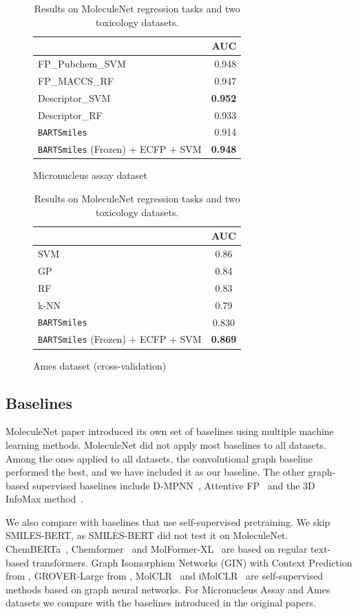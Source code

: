 \documentclass{article} %
\newcommand{\MODEL}{\texttt{BARTSmiles}}
\begin{document}
\begin{table}[h]
\begin{subfigure}{.4\textwidth}
\begin{tabular}{lr}
        \toprule
                           & AUC   \\ \midrule
        FP\_Pubchem\_SVM   & 0.948 \\
        FP\_MACCS\_RF      & 0.947 \\
        Descriptor\_SVM            & \textbf{0.952} \\
        Descriptor\_RF             & 0.933 \\ \midrule
        \MODEL{} & 0.914 \\
        \MODEL{} (Frozen) + ECFP + SVM & \textbf{0.948} \\ \bottomrule
\end{tabular}
\caption{Micronucleus assay dataset} 
        \begin{tabular}{lc}
        \toprule
                                  & \multicolumn{1}{c}{{AUC}} \\ \midrule
        SVM                       & 0.86  \\
        GP                         & 0.84    \\
        RF                         & 0.83    \\
        k-NN                       & 0.79    \\ \midrule
        \MODEL{}                   & 0.830   \\
        \MODEL{} (Frozen) + ECFP + SVM        & \textbf{0.869}   \\ \bottomrule          
        \end{tabular}
\caption{Ames dataset (cross-validation)}\label{tab:results-tox}
\end{subfigure}

\caption{Results on MoleculeNet regression tasks and two toxicology datasets.}
\end{table}

\subsection{Baselines}
MoleculeNet paper introduced its own set of baselines using multiple machine learning methods. MoleculeNet did not apply most baselines to all datasets. Among the ones applied to all datasets, the convolutional graph baseline performed the best, and we have included it as our baseline.
The other graph-based supervised baselines include %
D-MPNN~\citep{DMPNN-original}, Attentive FP~\citep{AttentiveFP} and the 3D InfoMax method~\citep{3dinfomaxGNN}.

We also compare with baselines that use self-supervised pretraining. We skip SMILES-BERT, as SMILES-BERT did not test it on MoleculeNet. ChemBERTa~\citep{chemberta}, Chemformer~\citep{chemformer} and MolFormer-XL~\citep{MolFormer} are based on regular text-based transformers. Graph Isomorphism Networks (GIN) with Context Prediction from \cite{GIN}, GROVER-Large from \citet{GROVER}, MolCLR~\citep{MolCLR} and iMolCLR~\citep{iMolCLR} are self-supervised methods based on graph neural networks. For Micronucleus Assay and Ames datasets we compare with the baselines introduced in the original papers.
\end{document}
